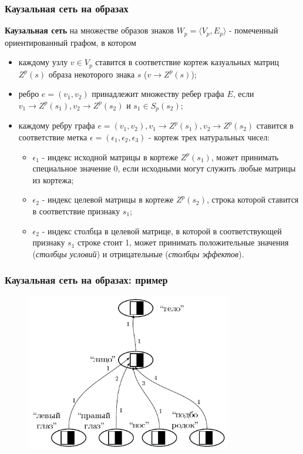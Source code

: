 \documentclass[default]{beamer}
\begin{document}
	\begin{frame}
		\frametitle{Каузальная сеть на образах}
		\footnotesize
		\textbf{Каузальная сеть} на множестве образов знаков $W_p=\langle V_p, E_p \rangle$ - помеченный ориентированный графом, в котором
		\begin{itemize}
			\item каждому узлу $v\in V_p$ ставится в соответствие кортеж казуальных матриц $Z^p(s)$ образа некоторого знака $s$ ($v\rightarrow Z^p(s)$);
			\item ребро $e=(v_1, v_2)$ принадлежит множеству ребер графа $E$, если $v_1\rightarrow Z^p(s_1), v_2\rightarrow Z^p(s_2)$ и $s_1\in S_p(s_2)$;
			\item каждому ребру графа $e=(v_1, v_2), v_1\rightarrow Z^p(s_1), v_2\rightarrow Z^p(s_2)$ ставится в соответствие метка $\epsilon=(\epsilon_1,\epsilon_2,\epsilon_3)$ - кортеж трех натуральных чисел:
			\begin{itemize}
				\item $\epsilon_1$ - индекс исходной матрицы в кортеже $Z^p(s_1)$, может принимать специальное значение 0, если исходными могут служить любые матрицы из кортежа;
				\item $\epsilon_2$ - индекс целевой матрицы в кортеже $Z^p(s_2)$, строка которой ставится в соответствие признаку $s_1$;
				\item $\epsilon_2$ - индекс столбца в целевой матрице, в которой в соответствующей признаку $s_1$ строке стоит 1, может принимать положительные значения (\textit{столбцы условий}) и отрицательные (\textit{столбцы эффектов}).
			\end{itemize}		
		\end{itemize}
	\end{frame}

	\begin{frame}
		\frametitle{Каузальная сеть на образах: пример}
		
		\begin{figure}
			\includegraphics[width=0.8\textwidth]{automata/caus_net}
		\end{figure}
	\end{frame}
\end{document}
